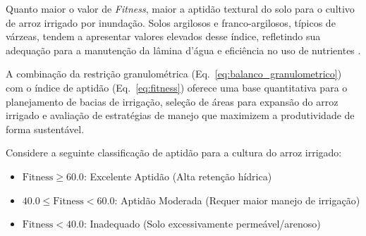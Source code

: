 \documentclass[12pt]{article}
\begin{document}
Quanto maior o valor de \textit{Fitness}, maior a aptidão textural do solo para o cultivo de arroz irrigado por inundação. Solos argilosos e franco-argilosos, típicos de várzeas, tendem a apresentar valores elevados desse índice, refletindo sua adequação para a manutenção da lâmina d'água e eficiência no uso de nutrientes .

A combinação da restrição granulométrica (Eq.~\ref{eq:balanco_granulometrico}) com o índice de aptidão (Eq.~\ref{eq:fitness}) oferece uma base quantitativa para o planejamento de bacias de irrigação, seleção de áreas para expansão do arroz irrigado e avaliação de estratégias de manejo que maximizem a produtividade de forma sustentável.

\vspace{0.3cm}

\vspace{0.2cm}
\noindent
Considere a seguinte classificação de aptidão para a cultura do arroz irrigado:
\begin{itemize}[leftmargin=1.5em]
  \item $\text{Fitness} \ge 60.0$: Excelente Aptidão (Alta retenção hídrica)
  \item $40.0 \le \text{Fitness} < 60.0$: Aptidão Moderada (Requer maior manejo de irrigação)
  \item $\text{Fitness} < 40.0$: Inadequado (Solo excessivamente permeável/arenoso)
\end{itemize}

\vspace{0.3cm}
\begin{center}
\end{center}
\end{document}
